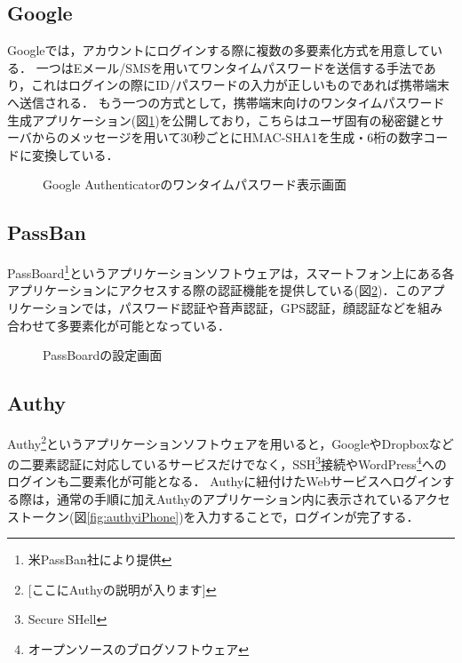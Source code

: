 \subsection{Google}
Googleでは，アカウントにログインする際に複数の多要素化方式を用意している．
一つはEメール/SMSを用いてワンタイムパスワードを送信する手法であり，これはログインの際にID/パスワードの入力が正しいものであれば携帯端末へ送信される．
もう一つの方式として，携帯端末向けのワンタイムパスワード生成アプリケーション(図\ref{fig:googleAuthenticator})を公開しており，こちらはユーザ固有の秘密鍵とサーバからのメッセージを用いて30秒ごとにHMAC-SHA1を生成・6桁の数字コードに変換している．

\begin{figure}[ht]
\begin{center}
\end{center}
\caption{Google Authenticatorのワンタイムパスワード表示画面}
\label{fig:googleAuthenticator}
\end{figure}

\subsection{PassBan}
PassBoard\footnote{米PassBan社により提供}というアプリケーションソフトウェアは，スマートフォン上にある各アプリケーションにアクセスする際の認証機能を提供している(図\ref{fig:passboard})．このアプリケーションでは，パスワード認証や音声認証，GPS認証，顔認証などを組み合わせて多要素化が可能となっている．

\begin{figure}[ht]
\begin{center}
\end{center}
\caption{PassBoardの設定画面}
\label{fig:passboard}
\end{figure}

\subsection{Authy}
Authy\footnote{[ここにAuthyの説明が入ります]}というアプリケーションソフトウェアを用いると，GoogleやDropboxなどの二要素認証に対応しているサービスだけでなく，SSH\footnote{Secure SHell}接続やWordPress\footnote{オープンソースのブログソフトウェア}へのログインも二要素化が可能となる．
Authyに紐付けたWebサービスへログインする際は，通常の手順に加えAuthyのアプリケーション内に表示されているアクセストークン(図\ref{fig:authyiPhone})を入力することで，ログインが完了する．

